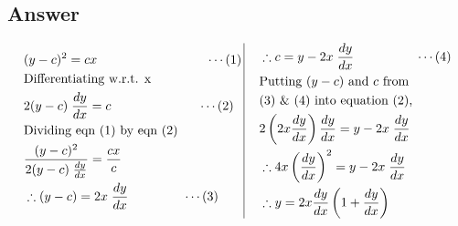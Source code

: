 \documentclass[17pt]{extarticle}
\begin{document}
\begin{fleqn}
\subsection*{Answer}
\begin{equation} \nonumber
\begin{alignedat}{4}
&  (y-c)^2 = cx  \hspace{3cm} \cdots (1)  \\
& \text{Differentiating w.r.t. x \ }\\
&  2(y-c)\; \frac{dy}{dx}= c  \hspace{2.4cm} \cdots (2)\;\\
& \text{Dividing eqn (1) by eqn (2)}\\
& \frac{(y-c)^2}{2(y-c)\; \frac{dy}{dx}} =\frac{cx}{c} \\
& \therefore (y-c) = 2x\;\frac{dy}{dx} \hspace{1.5cm} \cdots (3)\\
\end{alignedat}
\,
\vrule
\quad
\, 
\begin{alignedat}{4}
& \therefore c = y - 2x\;\frac{dy}{dx} \hspace{1.7cm} \cdots (4)\\
& \text{Putting } (y-c) \text{ and }c \text{ from }\\
& (3) \text{ \& } (4)\text{ into equation (2), }\\
& 2\left( 2x\frac{dy}{dx}\right)\frac{dy}{dx}=y - 2x\;\frac{dy}{dx}\\
& \therefore 4x\left(\frac{dy}{dx}\right)^2=y - 2x\;\frac{dy}{dx}\\
& \therefore y = 2x\frac{dy}{dx}\left(1 + \frac{dy}{dx}\right)\\
\end{alignedat}
\end{equation}


\end{fleqn}
\end{document}
